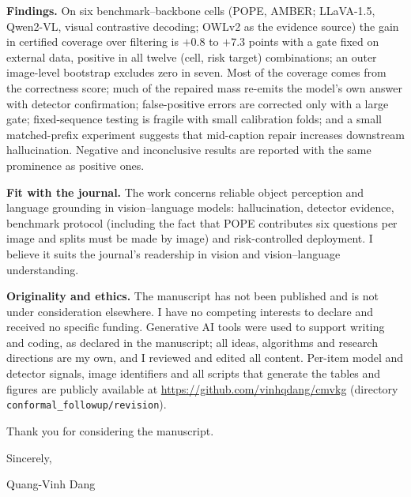 \documentclass[10.5pt,a4paper]{article}
\begin{document}
\textbf{Findings.} On six benchmark--backbone cells (POPE, AMBER; LLaVA-1.5, Qwen2-VL, visual contrastive decoding; OWLv2 as the evidence source) the gain in certified coverage over filtering is $+0.8$ to $+7.3$ points with a gate fixed on external data,
positive in all twelve (cell, risk target) combinations; an outer image-level bootstrap excludes zero in seven. Most of the coverage comes from the correctness score; much of the repaired mass re-emits the model's own answer with detector confirmation;
false-positive errors are corrected only with a large gate; fixed-sequence testing is fragile with small calibration folds; and a small matched-prefix experiment suggests that mid-caption repair increases downstream hallucination.
Negative and inconclusive results are reported with the same prominence as positive ones.

\textbf{Fit with the journal.} The work concerns reliable object perception and language grounding in vision--language models: hallucination, detector evidence, benchmark protocol (including the fact that POPE contributes six questions per image and
splits must be made by image) and risk-controlled deployment. I believe it suits the journal's readership in vision and vision--language understanding.

\textbf{Originality and ethics.} The manuscript has not been published and is not under consideration elsewhere. I have no competing interests to declare and received no specific funding. Generative AI tools were used to support writing and coding, as declared in the manuscript;
all ideas, algorithms and research directions are my own, and I reviewed and edited all content. Per-item model and detector signals, image identifiers and all scripts that generate the tables and figures are publicly available at
\url{https://github.com/vinhqdang/cmvkg} (directory \texttt{conformal\_followup/revision}).

Thank you for considering the manuscript.

Sincerely,

Quang-Vinh Dang
\end{document}
